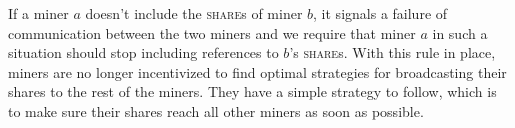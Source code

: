 \documentclass{article}
\begin{document}
If a miner $a$ doesn't include the \textsc{share}s of miner $b$, it
signals a failure of communication between the two miners and we
require that miner $a$ in such a situation should stop including
references to $b$'s \textsc{share}s. With this rule in place, miners
are no longer incentivized to find optimal strategies for broadcasting
their shares to the rest of the miners. They have a simple strategy to
follow, which is to make sure their shares reach all other miners as
soon as possible.





\end{document}
